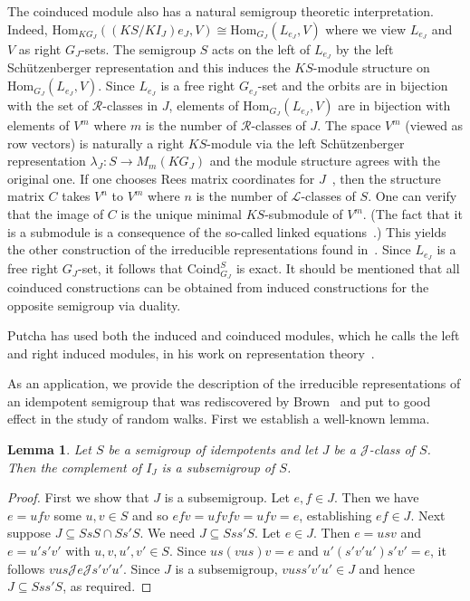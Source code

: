 \documentclass[reqno,11pt]{amsart}
\def\J{\mathrel{{\mathscr J}}} %
\def\R{\mathrel{{\mathscr R}}} %
\def\L{\mathrel{{\mathscr L}}} %
\def\to{\rightarrow}
\def\Lemmaname{Lemma}
\newtheorem{Lemma}[Thm]{\Lemmaname}
\numberwithin{equation}{section}
\begin{document}
The coinduced module also has a natural semigroup theoretic
interpretation.  Indeed,   \mbox{$\mathrm{Hom}_{KG_J}((KS/KI_J)e_J,V)\cong
\mathrm{Hom}_{G_J}(L_{e_J},V)$} where we view $L_{e_J}$ and $V$ as right
$G_{J}$-sets.  The semigroup
$S$ acts on the left of $L_{e_J}$ by the left
Sch\"utzenberger representation and this induces the $KS$-module
structure on $\mathrm{Hom}_{G_J}(L_{e_J},V)$. Since $L_{e_J}$ is a
free right $G_{e_J}$-set and the orbits are in bijection with the set
of $\R$-classes in $J$, elements of $\mathrm{Hom}_{G_J}(L_{e_J},V)$
are in bijection with elements of $V^m$ where $m$ is the number of
$\R$-classes of $J$.  The space $V^m$ (viewed as row vectors) is
naturally a right $KS$-module 
via the left Sch\"utzenberger representation $\lambda_J:S\to M_m(KG_J)$
and the module structure agrees with the original one.
If one chooses Rees matrix coordinates for $J$~\cite{CP,qtheor}, then
the structure matrix $C$ takes $V^n$ to $V^m$ where $n$ is the number
of $\L$-classes of $S$. One can verify that the image of $C$ is the
unique minimal
$KS$-submodule of $V^m$. (The fact that it
is a submodule is a consequence of the so-called linked equations~\cite{Arbib,qtheor}.) This yields the
other construction of the irreducible representations
found in~\cite{RhodesZalc}.  Since $L_{e_J}$ is a free right
$G_J$-set, it follows that $\mathrm{Coind}_{G_J}^S$ is exact.  It
should be mentioned that all coinduced 
constructions can be obtained from induced constructions for the
opposite semigroup via duality.

Putcha has used both
the induced and coinduced modules, which he calls the left and right
induced modules, in his work on representation
theory~\cite{Putcharep3,Putcharep5}.

As an application, we provide the description of the irreducible
representations of an idempotent semigroup that was rediscovered by
Brown~\cite{Brown1,Brown2} and put to good effect in the study of random
walks.  First we establish a well-known lemma.

\begin{Lemma}\label{bandstable}
Let $S$ be a semigroup of idempotents and let $J$ be a $\J$-class of
$S$.  Then the complement of $I_J$ is a subsemigroup of $S$.
\end{Lemma}
\begin{proof}
First we show that $J$ is a subsemigroup.  Let $e,f\in J$.  Then we have
$e=ufv$ some $u,v\in S$ and so $efv = ufvfv=ufv=e$, establishing $ef\in
J$. Next suppose $J\subseteq SsS\cap Ss'S$. We need $J\subseteq Sss'S$.
Let $e\in J$.  Then $e=usv$ and 
$e=u's'v'$ with $u,v,u',v'\in S$.  Since $us(vus)v=e$ and
$u'(s'v'u')s'v'=e$, it follows $vus\J e\J s'v'u'$.  Since $J$ is a
subsemigroup, $vuss'v'u'\in J$ and 
hence $J\subseteq Sss'S$, as required.
\end{proof}
\end{document}
